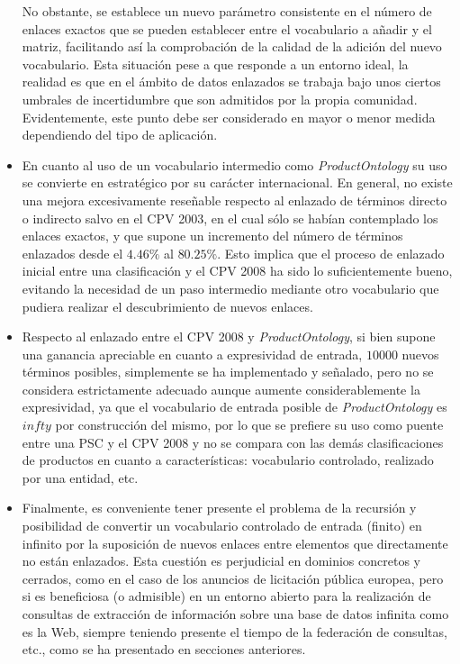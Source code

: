 \begin{itemize}
No obstante, se establece un nuevo parámetro consistente en el número de enlaces exactos que se pueden establecer 
entre el vocabulario a añadir y el matriz, facilitando así la comprobación de la calidad de la adición del nuevo 
vocabulario. Esta situación pese a que responde a un entorno ideal, la realidad es que en el ámbito de datos enlazados 
se trabaja bajo unos ciertos umbrales de incertidumbre que son admitidos por la propia comunidad. Evidentemente, 
este punto debe ser considerado en mayor o menor medida dependiendo del tipo de aplicación.

\item En cuanto al uso de un vocabulario intermedio como \textit{ProductOntology} su uso se convierte en estratégico 
por su carácter internacional. En general, no existe una mejora excesivamente reseñable respecto al enlazado de términos 
directo o indirecto salvo en el CPV 2003, en el cual sólo se habían contemplado los enlaces exactos, y que supone 
un incremento del número de términos enlazados desde el $4.46 \%$ al $80.25 \%$. Esto implica que el proceso de enlazado inicial 
entre una clasificación y el CPV 2008 ha sido lo suficientemente bueno, evitando la necesidad de un paso intermedio mediante 
otro vocabulario que pudiera realizar el descubrimiento de nuevos enlaces.

\item Respecto al enlazado entre el \gls{CPV} 2008 y \textit{ProductOntology}, si bien supone una ganancia apreciable en cuanto 
a expresividad de entrada, $10000$ nuevos términos posibles, simplemente se ha implementado y señalado, pero no se considera estrictamente 
adecuado aunque aumente considerablemente la expresividad, ya que el vocabulario de entrada posible de \textit{ProductOntology} es $infty$ por construcción del mismo, 
por lo que se prefiere su uso como puente entre una \gls{PSC} y el CPV 2008 y no se compara con las demás clasificaciones de productos en cuanto 
a características: vocabulario controlado, realizado por una entidad, etc.

\item Finalmente, es conveniente tener presente el problema de la recursión y posibilidad de convertir un vocabulario 
controlado de entrada (finito) en infinito por la suposición de nuevos enlaces entre elementos que directamente 
no están enlazados. Esta cuestión es perjudicial en dominios concretos y cerrados, como en el caso de los anuncios 
de licitación pública europea, pero si es beneficiosa (o admisible) en un entorno abierto para la realización de consultas 
de extracción de información sobre una base de datos infinita como es la Web, siempre teniendo presente el tiempo 
de la federación de consultas, etc., como se ha presentado en secciones anteriores.

\end{itemize}

